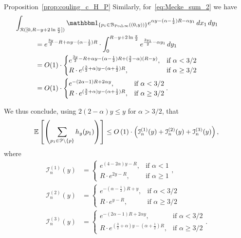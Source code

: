 \begin{proofof}{Proposition~\ref{prop:couling_c_H_P}}
Similarly, for~\eqref{eq:Mecke_sum_2} we have
\begin{align*}
	&\hspace{-30pt}\int_{\Rcal ([0, R - y + 2 \ln \frac{\pi}{2}])} \ind{p_1 \in \BallSym{(0,y)}} e^{\alpha y - (\alpha - \frac{1}{2})R - \alpha y_1} \, dx_1 \, dy_1\\
	&= e^{\frac{3y}{2} - R + \alpha y - (\alpha - \frac{1}{2})R} 
    	\cdot \int_{0}^{R - y + 2 \ln \frac{\pi}{2}} e^{\frac{3y_1}{2}-\alpha y_1} \, dy_1\\
	&= O(1)\cdot 
	\begin{cases} 
	e^{\frac{3y}{2} - R + \alpha y - (\alpha - \frac{1}{2})R + (\frac{3}{2} - \alpha)(R-y)} 
	, & \mbox{if $\alpha < 3/2$} \\ 
	R \cdot e^{(\frac{3}{2} +\alpha)y -  (\alpha + \frac{1}{2})R}, & \mbox{if 
	$\alpha \geq 3/2$}
	\end{cases}	\\
	&= O(1) \cdot 
	\begin{cases}
	  e^{-(2\alpha-1) R + 2 \alpha y}, & \mbox{if $\alpha < 3/2$} \\
	  R \cdot e^{(\frac{3}{2} +\alpha)y -  (\alpha + \frac{1}{2})R}, & \mbox{if 
	$\alpha \geq 3/2$}
	\end{cases}.
\end{align*}

We thus conclude, using $2(2 - \alpha)y \le y$ for $\alpha > 3/2$, that 
\begin{equation} \label{eq:upper_bound_faulty_edges} 
\mathbb{E}\left[\left( \sum_{p_1 \in {\mathcal P} \setminus\{p\}} 
		h_y (p_1)\right)\right] \le O\left(1\right) \cdot 
\left( \mathcal{I}_n^{(1)}(y) + \mathcal{I}_n^{(2)}(y) + \mathcal{I}_n^{(3)}(y) \right),
\end{equation}
where 
\begin{align*}
 \mathcal{I}_n^{(1)}(y) &= \begin{cases}
	e^{(4-2\alpha) y - R}, & \mbox{if $\alpha < 1$} \\
	R \cdot e^{2y - R}, & \mbox{if $\alpha \geq 1$}
	\end{cases},  \\
	\mathcal{I}_n^{(2)}(y) &= 
	\begin{cases}
	e^{-(\alpha - \frac{1}{2})R +y}, & \mbox{if $\alpha < 3/2$} \\
	R \cdot  e^{y - R}, & \mbox{if $\alpha \geq 3/2$}
	\end{cases}\\
	\mathcal{I}_n^{(3)}(y) &= 
\begin{cases}
	  e^{-(2\alpha-1) R + 2 \alpha y}, & \mbox{if $\alpha < 3/2$} \\
	  R \cdot e^{(\frac{3}{2} +\alpha)y -  (\alpha + \frac{1}{2})R}, & \mbox{if 
	$\alpha \geq 3/2$}
	\end{cases}.
\end{align*}


\end{proofof}
